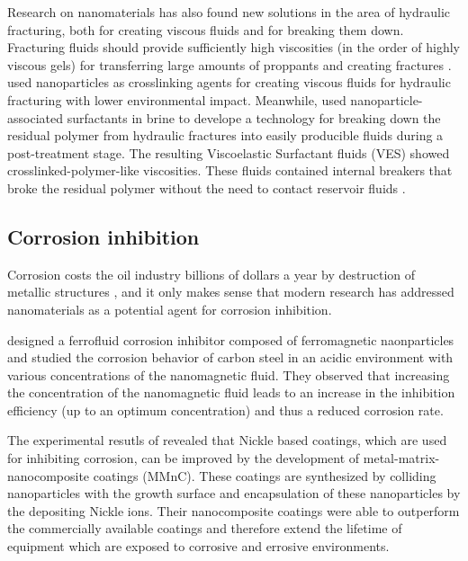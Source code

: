 Research on nanomaterials has also found new solutions in the area of hydraulic fracturing, both for creating viscous fluids and for breaking them down. Fracturing fluids should provide sufficiently high viscosities (in the order of highly viscous gels) for transferring large amounts of proppants and creating fractures \citep{Weaver2002}. \citet{Hurnaus2015} used nanoparticles as crosslinking agents for creating viscous fluids for hydraulic fracturing with lower environmental impact. Meanwhile, \citet{Crews2010} used nanoparticle-associated surfactants in brine to develope a technology for breaking down the residual polymer from hydraulic fractures into easily producible fluids during a post-treatment stage. The resulting Viscoelastic Surfactant fluids (VES) showed crosslinked-polymer-like viscosities. These fluids contained internal breakers that broke the residual polymer without the need to contact reservoir fluids \citep{Crews2007}.

\subsection{Corrosion inhibition}
Corrosion costs the oil industry billions of dollars a year by destruction of metallic structures \citep{Brondel1994}, and it only makes sense that modern research has addressed nanomaterials as a potential agent for corrosion inhibition. 

\citet{Jauhari2011} designed a ferrofluid corrosion inhibitor composed of ferromagnetic naonparticles and studied the corrosion behavior of carbon steel in an acidic environment with various concentrations of the nanomagnetic fluid. They observed that increasing the concentration of the nanomagnetic fluid leads to an increase in the inhibition efficiency (up to an optimum concentration) and thus a reduced corrosion rate. 

The experimental resutls of \citet{Murugesan2016} revealed that Nickle based coatings, which are used for inhibiting corrosion, can be improved by the development of metal-matrix-nanocomposite coatings (MMnC). These coatings are synthesized by colliding nanoparticles with the growth surface and encapsulation of these nanoparticles by the depositing Nickle ions. Their nanocomposite coatings were able to outperform the commercially available coatings and therefore extend the lifetime of equipment which are exposed to corrosive and errosive environments. 

